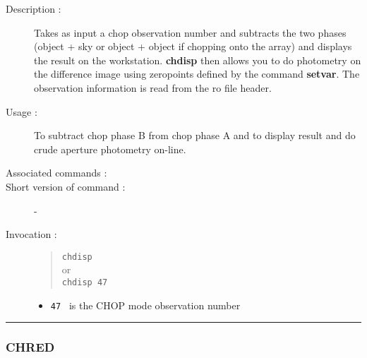 \begin{description}

\item[Description :] Takes as input a chop observation number and
subtracts the two phases (object + sky or object + object if chopping
onto the array) and displays the result on the workstation.  {\bf
chdisp} then allows you to do photometry on the difference image using
zeropoints defined by the command {\bf setvar}.  The observation
information is read from the {\sc ro} file header.

\item[Usage :] To subtract chop phase B from chop phase A and to
display result and do crude aperture photometry on-line.
\item[Associated commands :] {\tt {}}
\item[Short version of command :] -
\item[Invocation :]

\begin{quote}{\tt  chdisp }\\
or \\
{\tt chdisp 47 }
\end{quote}

\begin{itemize}

\item {\tt 47 } is the CHOP mode observation number
\end{itemize}

\end{description}

\hrule 
\subsubsection*{\label{CHRED}CHRED}

